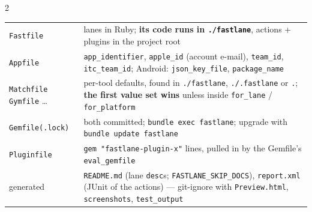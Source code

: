 \documentclass[8pt]{extarticle}
\newcommand\ct[1]{\texttt{#1}}
\newcommand\hd[1]{\par\vspace{3pt}\noindent{\bfseries\color{sheetBlue}#1}\par\vspace{1pt}}
\begin{document}

\begin{multicols}{2}
\raggedright
\footnotesize{}

\hd{The files}
{\scriptsize\setlength{\tabcolsep}{2pt}
\begin{tabular}{@{}>{\raggedright\arraybackslash}p{14mm}>{\raggedright\arraybackslash}p{64mm}@{}}
\toprule
\ct{Fastfile} & lanes in Ruby; \textbf{its code runs in \ct{./fastlane}}, actions + plugins in the project root \\
\ct{Appfile} & \ct{app\_identifier}, \ct{apple\_id} (account e-mail), \ct{team\_id}, \ct{itc\_team\_id}; Android: \ct{json\_key\_file}, \ct{package\_name} \\
\ct{Matchfile} \ct{Gymfile} \ldots & per-tool defaults, found in \ct{./fastlane}, \ct{./.fastlane} or \ct{.}; \textbf{the first value set wins} unless inside \ct{for\_lane} / \ct{for\_platform} \\
\ct{Gemfile(.lock)} & both committed; \ct{bundle exec fastlane}; upgrade with \ct{bundle update fastlane} \\
\ct{Pluginfile} & \ct{gem "fastlane-plugin-x"} lines, pulled in by the Gemfile's \ct{eval\_gemfile} \\
generated & \ct{README.md} (lane \ct{desc}s; \ct{FASTLANE\_SKIP\_DOCS}), \ct{report.xml} (JUnit of the actions) — git-ignore with \ct{Preview.html}, \ct{screenshots}, \ct{test\_output} \\
\bottomrule
\end{tabular}}


\end{multicols}
\end{document}
